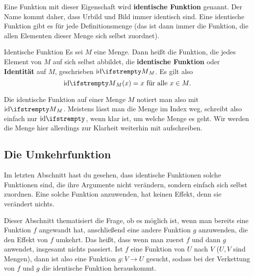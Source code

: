 \documentclass[../../main.tex]{subfiles}
\begin{document}
Eine Funktion mit dieser Eigenschaft wird \textbf{identische Funktion} genannt. Der Name kommt daher, dass Urbild und Bild immer identisch sind. Eine identische Funktion gibt es für jede Definitionsmenge (das ist dann immer die Funktion, die allen Elementen dieser Menge sich selbst zuordnet).

\begin{definition}{Identische Funktion}
    Es sei $M$ eine Menge. Dann heißt die Funktion, die jedes Element von $M$ auf sich selbst abbildet, die \textbf{identische Funktion} oder \textbf{Identität} auf $M$, geschrieben $\ident[M]$. Es gilt also \[\ident[M](x)=x\text{~für alle~}x\in M.\]
\end{definition}

Die identische Funktion auf einer Menge $M$ notiert man also mit $\ident[M]$. Meistens lässt man die Menge im Index weg, schreibt also einfach nur $\ident$, wenn klar ist, um welche Menge es geht. Wir werden die Menge hier allerdings zur Klarheit weiterhin mit aufschreiben.

\subsection{Die Umkehrfunktion}
\label{sec:abbildungen_umkehrabbildung}

Im letzten Abschnitt hast du gesehen, dass identische Funktionen solche Funktionen sind, die ihre Argumente nicht verändern, sondern einfach sich selbst zuordnen. Eine solche Funktion anzuwenden, hat keinen Effekt, denn sie verändert nichts.

Dieser Abschnitt thematisiert die Frage, ob es möglich ist, wenn man bereits eine Funktion $f$ angewandt hat, anschließend eine andere Funktion $g$ anzuwenden, die den Effekt von $f$ umkehrt. Das heißt, dass wenn man zuerst $f$ und dann $g$ anwendet, insgesamt nichts passiert. Ist $f$ eine Funktion von $U$ nach $V$ ($U,V$ sind Mengen), dann ist also eine Funktion $g\colon V\rightarrow U$ gesucht, sodass bei der Verkettung von $f$ und $g$ die identische Funktion herauskommt.

\end{document}
